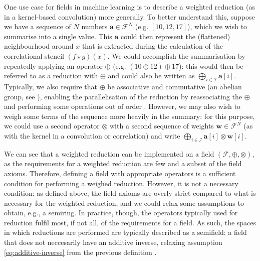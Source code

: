 \documentclass[a4paper, 12pt]{report}
\begin{document}
One use case for fields in machine learning is to describe a weighted reduction (as in a kernel-based convolution) more generally. To better understand this, suppose we have a sequence of $N$ numbers $\mathbf{a} \in \mathcal{F}^N$  (e.g. $[10, 12, 17]$), which we wish to summarise into a single value. This $\mathbf{a}$ could then represent the (flattened) neighbourhood around $x$ that is extracted during the calculation of the correlational stencil $(f \star g)(x)$. We could accomplish the summarisation by repeatedly applying an operator $\oplus$ (e.g. $(10 \oplus 12) \oplus 17$): this would then be referred to as a reduction with $\oplus$ and could also be written as $\bigoplus_{i\in \mathcal{I}}\mathbf{a}[i]$. Typically, we also require that $\oplus$ be associative and commutative (an abelian group, see \cite{beachy2006abstract}), enabling the parallelisation of the reduction by reassociating the $\oplus$ and performing some operations out of order \cite{ppad}. However, we may also wish to weigh some terms of the sequence more heavily in the summary: for this purpose, we could use a second operator $\otimes$ with a second sequence of weights $\mathbf{w} \in \mathcal{F}^N$ (as with the kernel in a convolution or correlation) and write $\bigoplus_{i\in \mathcal{I}}\mathbf{a}[i] \otimes \mathbf{w}[i]$. 

We can see that a weighted reduction can be implemented on a field $(\mathcal{F}, \oplus, \otimes)$, as the requirements for a weighted reduction are few and a subset of the field axioms. Therefore, defining a field with appropriate operators is a sufficient condition for performing a weighed reduction. However, it is not a necessary condition: as defined above, the field axioms are overly strict compared to what is necessary for the weighted reduction, and we could relax some assumptions to obtain, e.g., a semiring. In practice, though, the operators typically used for reduction fulfil most, if not all, of the requirements for a field. As such, the spaces in which reductions are performed are typically described as a semifield: a field that does not neccesarily have an additive inverse, relaxing assumption \ref{eq:additive-inverse} from the previous definition \cite{bellaardaxiomatic}.
\end{document}
